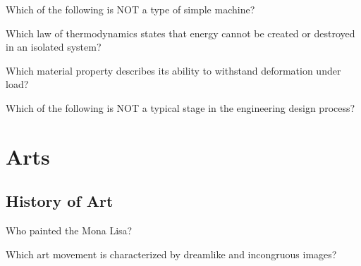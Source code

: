 \documentclass[12pt,a4paper]{book}
\begin{document}
\begin{enhancedmcq}{Which of the following is NOT a type of simple machine?}
\end{enhancedmcq}

\begin{enhancedmcq}[Thermodynamics]{Which law of thermodynamics states that energy cannot be created or destroyed in an isolated system?}
\end{enhancedmcq}

\begin{enhancedmcq}{Which material property describes its ability to withstand deformation under load?}
\end{enhancedmcq}

\begin{enhancedmcq}{Which of the following is NOT a typical stage in the engineering design process?}
\end{enhancedmcq}

\chapter{Arts}
\section{History of Art}

\begin{enhancedmcq}{Who painted the Mona Lisa?}
\end{enhancedmcq}

\begin{enhancedmcq}{Which art movement is characterized by dreamlike and incongruous images?}
\end{enhancedmcq}
\end{document}
